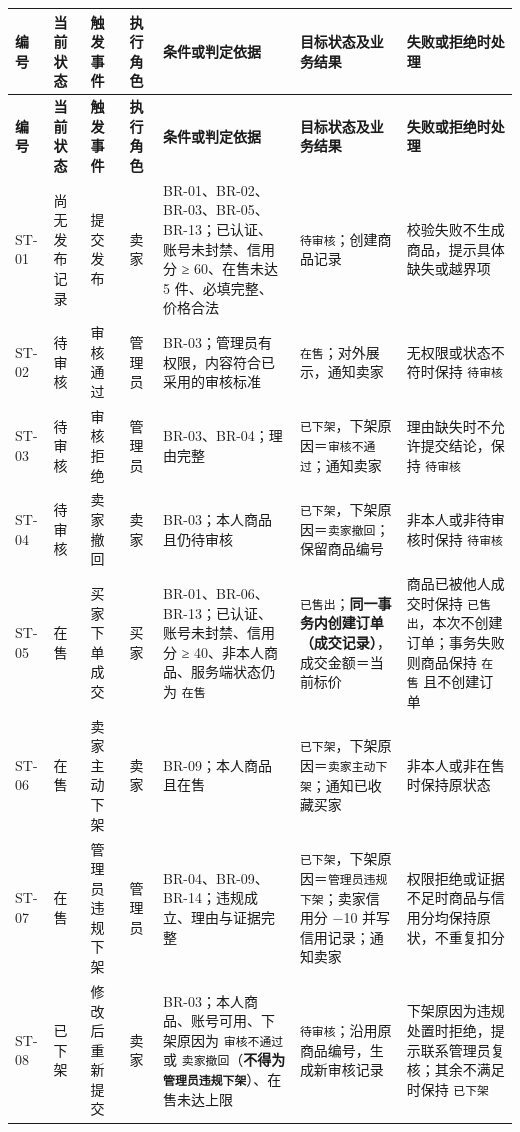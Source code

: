 \documentclass[12pt,a4paper]{ctexart}
\begin{document}
{\scriptsize
\begin{longtable}{|p{1.38cm}|p{1.38cm}|p{1.38cm}|p{1.71cm}|p{3.46cm}|p{3.53cm}|p{3.16cm}|}
\hline
\textbf{编号} & \textbf{当前状态} & \textbf{触发事件} & \textbf{执行角色} & \textbf{条件或判定依据} & \textbf{目标状态及业务结果} & \textbf{失败或拒绝时处理} \\
\hline
\endfirsthead
\hline
\textbf{编号} & \textbf{当前状态} & \textbf{触发事件} & \textbf{执行角色} & \textbf{条件或判定依据} & \textbf{目标状态及业务结果} & \textbf{失败或拒绝时处理} \\
\hline
\endhead
\hline
\endfoot
ST-01 & 尚无发布记录 & 提交发布 & 卖家 & BR-01、BR-02、BR-03、BR-05、BR-13；已认证、账号未封禁、信用分 ≥ 60、在售未达 5 件、必填完整、价格合法 & \texttt{待审核}；创建商品记录 & 校验失败不生成商品，提示具体缺失或越界项 \\
\hline
ST-02 & 待审核 & 审核通过 & 管理员 & BR-03；管理员有权限，内容符合已采用的审核标准 & \texttt{在售}；对外展示，通知卖家 & 无权限或状态不符时保持 \texttt{待审核} \\
\hline
ST-03 & 待审核 & 审核拒绝 & 管理员 & BR-03、BR-04；理由完整 & \texttt{已下架}，下架原因＝\texttt{审核不通过}；通知卖家 & 理由缺失时不允许提交结论，保持 \texttt{待审核} \\
\hline
ST-04 & 待审核 & 卖家撤回 & 卖家 & BR-03；本人商品且仍待审核 & \texttt{已下架}，下架原因＝\texttt{卖家撤回}；保留商品编号 & 非本人或非待审核时保持 \texttt{待审核} \\
\hline
ST-05 & 在售 & 买家下单成交 & 买家 & BR-01、BR-06、BR-13；已认证、账号未封禁、信用分 ≥ 40、非本人商品、服务端状态仍为 \texttt{在售} & \texttt{已售出}；\textbf{同一事务内创建订单（成交记录）}，成交金额＝当前标价 & 商品已被他人成交时保持 \texttt{已售出}，本次不创建订单；事务失败则商品保持 \texttt{在售} 且不创建订单 \\
\hline
ST-06 & 在售 & 卖家主动下架 & 卖家 & BR-09；本人商品且在售 & \texttt{已下架}，下架原因＝\texttt{卖家主动下架}；通知已收藏买家 & 非本人或非在售时保持原状态 \\
\hline
ST-07 & 在售 & 管理员违规下架 & 管理员 & BR-04、BR-09、BR-14；违规成立、理由与证据完整 & \texttt{已下架}，下架原因＝\texttt{管理员违规下架}；卖家信用分 −10 并写信用记录；通知卖家 & 权限拒绝或证据不足时商品与信用分均保持原状，不重复扣分 \\
\hline
ST-08 & 已下架 & 修改后重新提交 & 卖家 & BR-03；本人商品、账号可用、下架原因为 \texttt{审核不通过} 或 \texttt{卖家撤回}（\textbf{不得为 \texttt{管理员违规下架}}）、在售未达上限 & \texttt{待审核}；沿用原商品编号，生成新审核记录 & 下架原因为违规处置时拒绝，提示联系管理员复核；其余不满足时保持 \texttt{已下架} \\

\end{longtable}}
\end{document}
